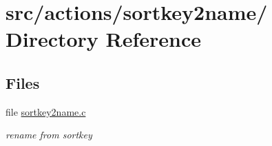 \hypertarget{dir_000041}{
\section{src/actions/sortkey2name/ Directory Reference}
\label{dir_000041}
}
\subsection*{Files}
\begin{CompactItemize}
\item 
file \hyperlink{sortkey2name_8c}{sortkey2name.c}
\begin{CompactList}\small\item\em rename from sortkey \item\end{CompactList}

\end{CompactItemize}
